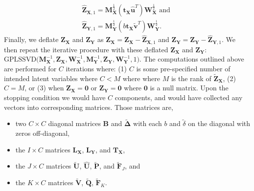 \documentclass[12pt]{article}
\begin{document}
\begin{equation}
\begin{aligned}
\widehat{\mathbf Z}_{{\mathbf X},1} = {\mathbf M}_{\mathbf X}^{\frac{1}{2}}({\mathbf t}_{\mathbf X}\widehat{\mathbf u}^{T}){\mathbf W}_{\mathbf X}^{\frac{1}{2}} \text{ and } \\
\widehat{\mathbf Z}_{{\mathbf Y},1} = {\mathbf M}_{\mathbf Y}^{\frac{1}{2}}(b{\mathbf t}_{\mathbf X}\widetilde{\mathbf v}^{T}){\mathbf W}_{\mathbf Y}^{\frac{1}{2}}.
\label{eq:rank1_preds_plscar}
\end{aligned}
\end{equation} Finally, we deflate \({\mathbf Z}_{\mathbf X}\) and
\({\mathbf Z}_{\mathbf Y}\) as
\({\mathbf Z}_{\mathbf X} = {\mathbf Z}_{\mathbf X} - \widehat{\mathbf Z}_{{\mathbf X},1}\)
and
\({\mathbf Z}_{\mathbf Y} = {\mathbf Z}_{\mathbf Y} - \widehat{\mathbf Z}_{{\mathbf Y},1}\).
We then repeat the iterative procedure with these deflated
\({\mathbf Z}_{\mathbf X}\) and \({\mathbf Z}_{\mathbf Y}\):
\(\mathrm{GPLSSVD(} {\mathbf M}_{\mathbf X}^{-1}, {\mathbf Z}_{\mathbf X}, {\mathbf W}_{\mathbf X}^{-1}, {\mathbf M}_{\mathbf Y}^{-1}, {\mathbf Z}_{\mathbf Y}, {\mathbf W}_{\mathbf Y}^{-1}, 1 \mathrm{)}\).
The computations outlined above are performed for \(C\) iterations
where: (1) \(C\) is some pre-specified number of intended latent
variables where \(C < M\) where where \(M\) is the rank of
\(\widetilde{\mathbf Z}_{\mathbf X}\), (2) \(C=M\), or (3) when
\({\mathbf Z}_{\mathbf X} = {\mathbf 0}\) or
\({\mathbf Z}_{\mathbf Y} = {\mathbf 0}\) where \({\mathbf 0}\) is a
null matrix. Upon the stopping condition we would have \(C\) components,
and would have collected any vectors into corresponding matrices. Those
matrices are,

\begin{itemize}
\item
  two \(C \times C\) diagonal matrices \({\mathbf B}\) and
  \(\widetilde{\boldsymbol \Delta}\) with each \(b\) and
  \(\tilde\delta\) on the diagonal with zeros off-diagonal,
\item
  the \(I \times C\) matrices \({\mathbf L}_{\mathbf X}\),
  \({\mathbf L}_{\mathbf Y}\), and \({\mathbf T}_{\mathbf X}\),
\item
  the \(J \times C\) matrices \(\widetilde{\mathbf U}\),
  \(\widehat{\mathbf U}\), \(\widetilde{\mathbf P}\), and
  \(\widetilde{\mathbf F}_{J}\), and
\item
  the \(K \times C\) matrices \(\widetilde{\mathbf V}\),
  \(\widetilde{\mathbf Q}\), \(\widetilde{\mathbf F}_{K}\).
\end{itemize}
\end{document}

